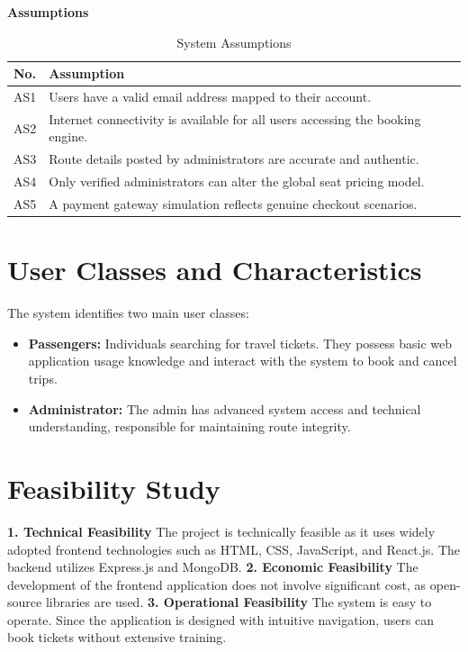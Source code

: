 \textbf{Assumptions}

\begin{table}[H]
\centering
\begin{tabular}{|p{1cm}|p{14cm}|}
\hline
\textbf{No.} & \textbf{Assumption} \\ \hline
AS1 & Users have a valid email address mapped to their account. \\ \hline
AS2 & Internet connectivity is available for all users accessing the booking engine. \\ \hline
AS3 & Route details posted by administrators are accurate and authentic. \\ \hline
AS4 & Only verified administrators can alter the global seat pricing model. \\ \hline
AS5 & A payment gateway simulation reflects genuine checkout scenarios. \\ \hline
\end{tabular}
\caption{System Assumptions}
\end{table}

\section{User Classes and Characteristics}
The system identifies two main user classes:
\begin{itemize}
    \item \textbf{Passengers:} Individuals searching for travel tickets. They possess basic web application usage knowledge and interact with the system to book and cancel trips.
    \item \textbf{Administrator:} The admin has advanced system access and technical understanding, responsible for maintaining route integrity.
\end{itemize}

\section{Feasibility Study}
\textbf{1. Technical Feasibility}
The project is technically feasible as it uses widely adopted frontend technologies such as HTML, CSS, JavaScript, and React.js. The backend utilizes Express.js and MongoDB.
\textbf{2. Economic Feasibility}
The development of the frontend application does not involve significant cost, as open-source libraries are used.
\textbf{3. Operational Feasibility}
The system is easy to operate. Since the application is designed with intuitive navigation, users can book tickets without extensive training.

